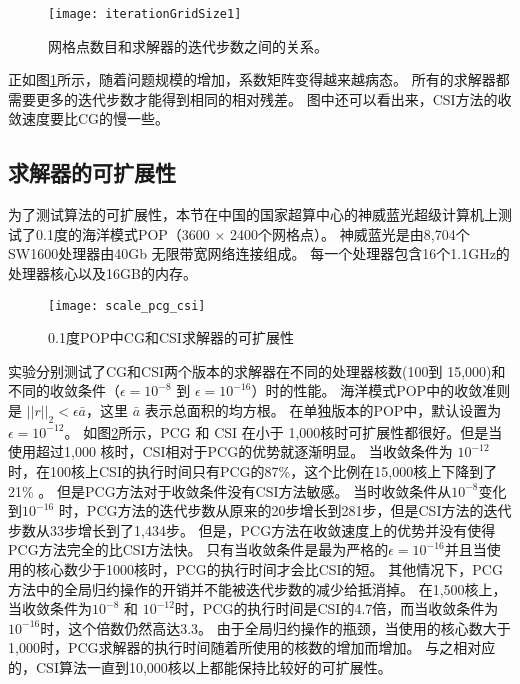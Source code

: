 \begin{figure}[!ht]
\vspace{5pt}
\centering
\texttt{[image: iterationGridSize1]}
\caption[] {网格点数目和求解器的迭代步数之间的关系。\label{fig:iterationGridSize}}
\end{figure}

正如图\ref{fig:iterationGridSize}所示，随着问题规模的增加，系数矩阵变得越来越病态。
所有的求解器都需要更多的迭代步数才能得到相同的相对残差。 
图中还可以看出来，CSI方法的收敛速度要比CG的慢一些。 



 
\subsection{求解器的可扩展性} \label{solver:exp:csi}

为了测试算法的可扩展性，本节在中国的国家超算中心的神威蓝光超级计算机上测试了0.1度的海洋模式POP（3600 $\times$ 2400个网格点）。
神威蓝光是由8,704个SW1600处理器由40Gb 无限带宽网络连接组成。
每一个处理器包含16个1.1GHz的处理器核心以及16GB的内存。 

\begin {figure}[ht]
\centering
\texttt{[image: scale\_pcg\_csi]}
\caption []{ 0.1度POP中CG和CSI求解器的可扩展性 \label {fig:scale}}
\end {figure}
实验分别测试了CG和CSI两个版本的求解器在不同的处理器核数(100到 15,000)和不同的收敛条件（$\epsilon = 10^{-8}$ 到 $\epsilon = 10^{-16}$）时的性能。
海洋模式POP中的收敛准则是 $||r||_2<\epsilon \bar{a}$，这里 $\bar{a}$ 表示总面积的均方根。 
在单独版本的POP中，默认设置为 $\epsilon = 10^{-12}$。 
如图\ref{fig:scale}所示，PCG 和 CSI 在小于  1,000核时可扩展性都很好。但是当使用超过1,000 核时，CSI相对于PCG的优势就逐渐明显。 
当收敛条件为 $10^{-12}$时，在100核上CSI的执行时间只有PCG的87\%，这个比例在15,000核上下降到了 21\% 。
但是PCG方法对于收敛条件没有CSI方法敏感。 
当时收敛条件从$10^{-8}$变化到$10^{-16}$ 时，PCG方法的迭代步数从原来的20步增长到281步，但是CSI方法的迭代步数从33步增长到了1,434步。 
但是，PCG方法在收敛速度上的优势并没有使得PCG方法完全的比CSI方法快。 
只有当收敛条件是最为严格的$\epsilon = 10^{-16}$并且当使用的核心数少于1000核时，PCG的执行时间才会比CSI的短。
其他情况下，PCG方法中的全局归约操作的开销并不能被迭代步数的减少给抵消掉。
在1,500核上，当收敛条件为$10^{-8}$ 和 $10^{-12}$时，PCG的执行时间是CSI的4.7倍，而当收敛条件为$10^{-16}$时，这个倍数仍然高达3.3。
由于全局归约操作的瓶颈，当使用的核心数大于1,000时，PCG求解器的执行时间随着所使用的核数的增加而增加。 
与之相对应的，CSI算法一直到10,000核以上都能保持比较好的可扩展性。

